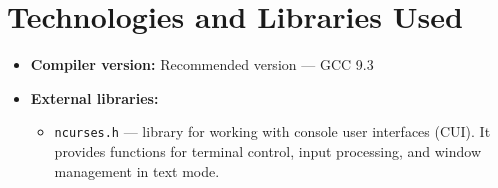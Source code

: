 \documentclass{article}
\begin{document}
\section{Technologies and Libraries Used}

\begin{itemize}
    \item \textbf{Compiler version:} Recommended version — GCC 9.3
    \item \textbf{External libraries:}
    \begin{itemize}
        \item \texttt{ncurses.h} — library for working with console user interfaces (CUI). It provides functions for terminal control, input processing, and window management in text mode.
    \end{itemize}
\end{itemize}
\end{document}
